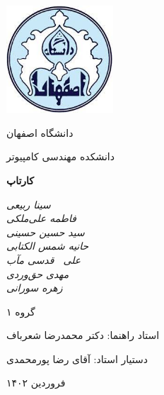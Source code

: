 \documentclass[12pt, oneside]{book}
\begin{document}
    \begin{titlepage}
    	\centering
    	\includegraphics[width=4cm, height=4cm]{./images/logo}\par
        \vspace{2mm}
    	دانشگاه اصفهان \par
        دانشکده مهندسی کامپیوتر \par

    	\vspace{1cm}
    	{\huge \textbf{کارتاپ}\par}
    	\vspace{3cm}
    	{\small\itshape
        سینا ربیعی \\
    	فاطمه علی‌ملکی \\
    	سید حسین حسینی \\
    	حانیه شمس الکتابی \\
    	علی 
    	$\ $
    	قدسی مآب \\
    	مهدی حق‌وردی \\
    	زهره سورانی \par}
		
		\vfill گروه ۱ \par	\vfill
		
    	\vfill
        استاد راهنما:‌ دکتر محمدرضا شعرباف \par
        دستیار استاد:‌ آقای رضا پورمحمدی
    	\vfill

    	{\large فروردین ۱۴۰۲\par}
    \end{titlepage}
\end{document}
